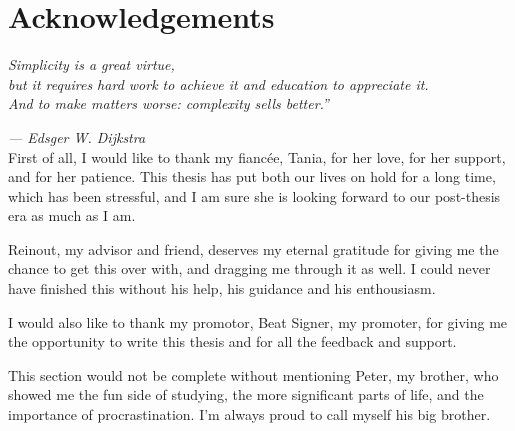 
 \chapter*{Acknowledgements}

  \emph{Simplicity is a great virtue,\\
  but it requires hard work to achieve it and education to appreciate it.\\
  And to make matters worse: complexity sells better.''}

  \hfill\emph{--- Edsger W. Dijkstra}\\


  First of all, I would like to thank my fianc\'ee, Tania, for her love, for
  her support, and for her patience. This thesis has put both our lives on hold
  for a long time, which has been stressful, and I am sure she is looking
  forward to our post-thesis era as much as I am.


  Reinout, my advisor and friend, deserves my eternal gratitude for giving me
  the chance to get this over with, and dragging me through it as well. I
  could never have finished this without his help, his guidance and his
  enthousiasm.

  I would also like to thank my promotor, Beat Signer, my promoter, for giving
  me the opportunity to write this thesis and for all the feedback and support.

  This section would not be complete without mentioning Peter, my brother, who
  showed me the fun side of studying, the more significant parts of life, and
  the importance of procrastination. I'm always proud to call myself his big
  brother.

